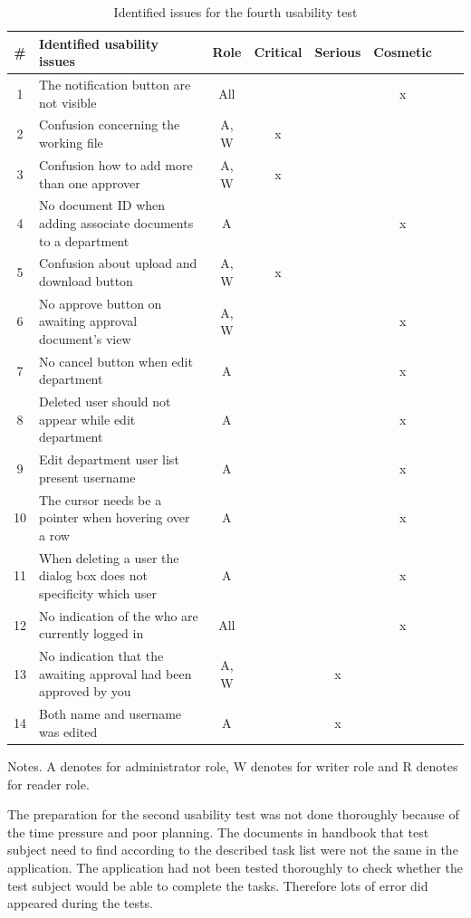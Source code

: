 \begin{table}[H]
	\begin{center}
	\begin{tabular}{| c | m{15em} | c | c | c | c | c | c |}
		\hline
		\# & \textbf{Identified usability issues} & Role & Critical & Serious & Cosmetic \\
		\hline
		 1 & The notification button are not visible & All & & & x \\
		\hline
		 2 & Confusion concerning the working file & A, W & x & & \\
		\hline
		 3 & Confusion how to add more than one approver & A, W & x & & \\
		\hline
		4 & No document ID when adding associate documents to a department & A & & & x\\
		\hline
		5 &  Confusion about upload and download button & A, W & x &  &\\
		\hline
		6 & No approve button on awaiting approval document's view & A, W &  & & x\\
		\hline
		7 & No cancel button when edit department & A & & & x\\
		\hline
		8 & Deleted user should not appear while edit department & A & & & x \\
		\hline
		9 & Edit department user list present username & A &  & & x \\
		\hline
		10 & The cursor needs be a pointer when hovering over a row & A &  &  & x \\
		\hline
		11 & When deleting a user the dialog box  does not specificity which user & A & & & x\\
		\hline
		12 & No indication of the who are currently logged in & All & & & x \\
		\hline
		13 & No indication that the awaiting approval had been approved by you & A, W & & x & \\
		\hline
		14 & Both name and username was edited & A & & x & \\
		\hline
	\end{tabular}
	\end{center}
	 {\raggedright Notes. A denotes for administrator role, W denotes for writer role and R denotes for reader role.\par}
	\caption{Identified issues for the fourth usability test}\label{tab:utest4}
\end{table}

The preparation for the second usability test was not done thoroughly because of the time pressure and poor planning. 
The documents in handbook that test subject need to find according to the  described task list were not the same in the application. 
The application had not been tested thoroughly to check whether the test subject would be able to complete the tasks.
Therefore lots of error did appeared during the tests.  

